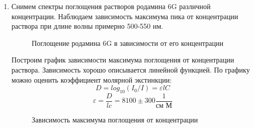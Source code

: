 \documentclass[a4paper,12pt]{article}
\begin{document}
\begin{enumerate}
\item Снимем спектры поглощения растворов родамина 6G различной концентрации. Наблюдаем зависимость максимума пика от концентрации раствора при длине волны примерно 500-550 нм.
\begin{figure}[h!]
\caption{Поглощение родамина 6G в зависимости от его концентрации}
\end{figure}

Построим график зависимости максимума поглощения от концентрации раствора. Зависимость хорошо описывается линейной функцией. По графику можно оценить коэффициент молярной экстинкции: $$D = log_{10}(I_0/I)=\varepsilon l C$$
$$\varepsilon = \frac{D}{lc} = 8100 \pm 300 \frac{1}{\text{см М}} $$


\begin{figure}[h!]
\caption{Зависимость максимума поглощения от концентрации
}
\end{figure}


\end{enumerate}
\end{document}
